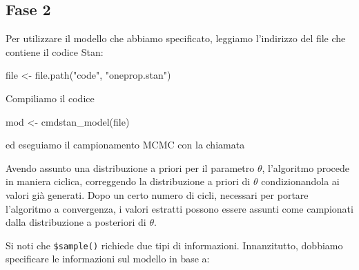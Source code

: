 \documentclass[
  11pt,
]{krantz}
\makeatletter
\newenvironment{Shaded}{\begin{snugshade}}{\end{snugshade}}
\newcommand{\AttributeTok}[1]{\textcolor[rgb]{0.61,0.61,0.61}{#1}}
\newcommand{\DecValTok}[1]{\textcolor[rgb]{0.06,0.06,0.06}{#1}}
\newcommand{\FunctionTok}[1]{\textcolor[rgb]{0,0,0}{#1}}
\newcommand{\NormalTok}[1]{#1}
\newcommand{\OtherTok}[1]{\textcolor[rgb]{0.37,0.37,0.37}{#1}}
\newcommand{\SpecialCharTok}[1]{\textcolor[rgb]{0,0,0}{#1}}
\newcommand{\StringTok}[1]{\textcolor[rgb]{0.5,0.5,0.5}{#1}}
\newenvironment{kframe}{%
\medskip{}
\setlength{\fboxsep}{.8em}
 \def\at@end@of@kframe{}%
 \ifinner\ifhmode%
  \def\at@end@of@kframe{\end{minipage}}%
  \begin{minipage}{\columnwidth}%
 \fi\fi%
 \def\FrameCommand##1{\hskip\@totalleftmargin \hskip-\fboxsep
 \colorbox{shadecolor}{##1}\hskip-\fboxsep
     \hskip-\linewidth \hskip-\@totalleftmargin \hskip\columnwidth}%
 \MakeFramed {\advance\hsize-\width
   \@totalleftmargin\z@ \linewidth\hsize
   \@setminipage}}%
 {\par\unskip\endMakeFramed%
 \at@end@of@kframe}
\renewenvironment{Shaded}{\begin{kframe}}{\end{kframe}}
\theoremstyle{definition}
\theoremstyle{definition}
\theoremstyle{definition}
\theoremstyle{definition}
\theoremstyle{remark}
\makeatother
\begin{document}
\hypertarget{fase-2}{%
\subsection{Fase 2}\label{fase-2}}

Per utilizzare il modello che abbiamo specificato, leggiamo l'indirizzo del file che contiene il codice Stan:

\begin{Shaded}
\begin{Highlighting}[]
\NormalTok{file }\OtherTok{\textless{}{-}} \FunctionTok{file.path}\NormalTok{(}\StringTok{"code"}\NormalTok{, }\StringTok{"oneprop.stan"}\NormalTok{)}
\end{Highlighting}
\end{Shaded}

Compiliamo il codice

\begin{Shaded}
\begin{Highlighting}[]
\NormalTok{mod }\OtherTok{\textless{}{-}} \FunctionTok{cmdstan\_model}\NormalTok{(file)}
\end{Highlighting}
\end{Shaded}

ed eseguiamo il campionamento MCMC con la chiamata

\begin{Shaded}
\end{Shaded}

Avendo assunto una distribuzione a priori per il parametro \(\theta\), l'algoritmo procede in maniera ciclica, correggendo la distribuzione a priori di \(\theta\) condizionandola ai valori già generati. Dopo un certo numero di cicli, necessari per portare l'algoritmo a convergenza, i valori estratti possono essere assunti come campionati dalla distribuzione a posteriori di \(\theta\).

Si noti che \texttt{\$sample()} richiede due tipi di informazioni. Innanzitutto, dobbiamo specificare le informazioni sul modello in base a:
\end{document}
